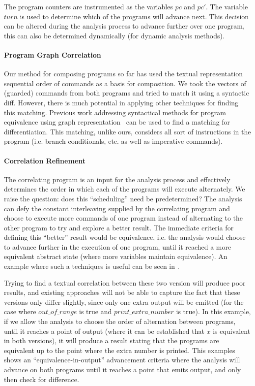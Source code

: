 

The program counters are instrumented as the variables $pc$ and $pc'$. The variable $turn$ is used to determine which of the programs will advance next. This decision can be altered during the analysis process to advance further over one program, this can also be determined dynamically (for dynamic analysis methods).

\paragraph{Program Graph Correlation}
Our method for composing programs so far has used the textual representation sequential order of commands as a basis for composition. We took the vectors of (guarded) commands from both programs and tried to match it using a syntactic diff. However, there is much potential in applying other techniques for finding this matching. Previous work addressing syntactical methods for program equivalence using graph representation~\cite{Horwitz89,Horwitz90} can be used to find a matching for differentiation. This matching, unlike ours, considers all sort of instructions in the program (i.e. branch conditionals, etc. as well as imperative commands).

\paragraph{Correlation Refinement} The correlating program is an input for the analysis process and effectively determines the order in which each of the programs will execute alternately. We raise the question: does this ``scheduling'' need be predetermined? The analysis can defy the constant interleaving supplied by the correlating program and choose to execute more commands of one program instead of alternating to the other program to try and explore a better result. The immediate criteria for defining this ``better'' result would be equivalence, i.e. the analysis would choose to advance further in the execution of one program, until it reached a more equivalent abstract state (where more variables maintain equivalence). An example where such a techniques is useful can be seen in .



Trying to find a textual correlation between these two version will produce poor results, and existing approaches will not be able to capture the fact that these versions only differ slightly, since only one extra output will be emitted (for the case where $out\_of\_range$ is true and $print\_extra\_number$ is true). In this example, if we allow the analysis to choose the order of alternation between programs, until it reaches a point of output (where it can be established that $x$ is equivalent in both versions), it will produce a result stating that the programs are equivalent up to the point where the extra number is printed. This examples shows an ``equivalence-in-output'' advancement criteria where the analysis will advance on both programs until it reaches a point that emits output, and only then check for difference.

